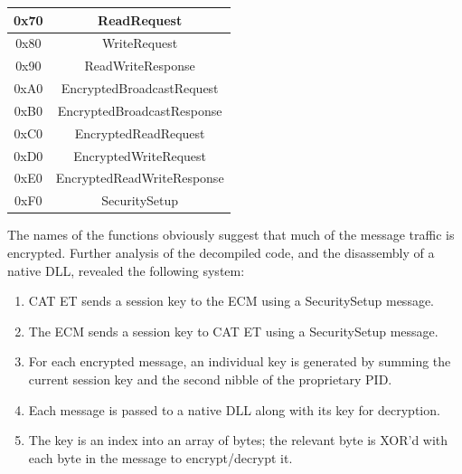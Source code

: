 \begin{table}
 \begin{center}
   \begin{tabular}{|c|c|}
    \hline
    0x70 & ReadRequest \\
    \hline
    0x80 & WriteRequest \\
    \hline
    0x90 & ReadWriteResponse\\
    \hline
    0xA0 & EncryptedBroadcastRequest\\
    \hline
    0xB0 & EncryptedBroadcastResponse\\
    \hline
    0xC0 & EncryptedReadRequest\\
    \hline
    0xD0 & EncryptedWriteRequest\\
    \hline
    0xE0 & EncryptedReadWriteResponse\\
    \hline
    0xF0 & SecuritySetup\\
    \hline
   \end{tabular}

 \end{center}
\end{table}

The names of the functions obviously suggest that much of the message traffic is encrypted. Further analysis of the
decompiled code, and the disassembly of a native DLL,  revealed the following system:

\begin{enumerate}
  \item CAT ET sends a session key to the ECM using a SecuritySetup message.
  \item The ECM sends a session key to CAT ET using a SecuritySetup message.
  \item For each encrypted message, an individual key is generated by summing the
        current session key and the second nibble of the proprietary PID.
  \item Each message is passed to a native DLL along with its key for decryption.
  \item The key is an index into an array of bytes; the relevant byte is XOR'd
        with each byte in the message to encrypt/decrypt it.
\end{enumerate}


